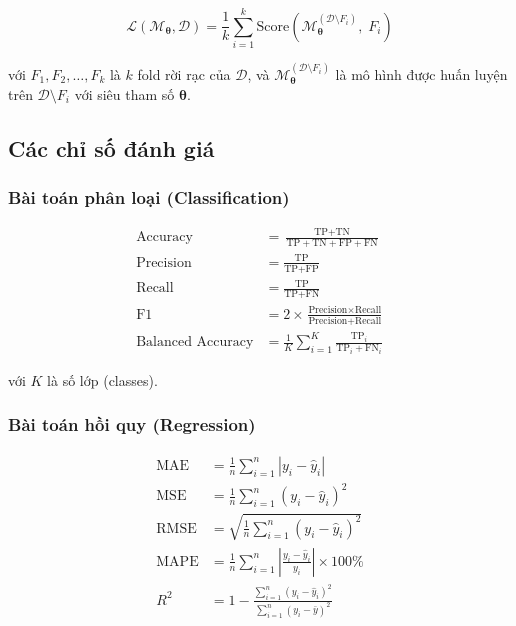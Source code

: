 \documentclass[12pt,a4paper]{article}
\begin{document}
\begin{equation}
    \mathcal{L}(\mathcal{M}_{\boldsymbol{\theta}}, \mathcal{D}) =
    \frac{1}{k} \sum_{i=1}^{k}
    \text{Score}\!\left(
        \mathcal{M}_{\boldsymbol{\theta}}^{(\mathcal{D} \setminus F_i)},\; F_i
    \right)
    \label{eq:cv_score}
\end{equation}

\noindent với $F_1, F_2, \ldots, F_k$ là $k$ fold rời rạc của $\mathcal{D}$,
và $\mathcal{M}_{\boldsymbol{\theta}}^{(\mathcal{D} \setminus F_i)}$ là mô hình
được huấn luyện trên $\mathcal{D} \setminus F_i$ với siêu tham số
$\boldsymbol{\theta}$.

\subsection{Các chỉ số đánh giá}

\subsubsection{Bài toán phân loại (Classification)}

\begin{align}
    \text{Accuracy} &= \frac{\text{TP} + \text{TN}}
                          {\text{TP} + \text{TN} + \text{FP} + \text{FN}}
    \label{eq:accuracy} \\[6pt]
    \text{Precision} &= \frac{\text{TP}}{\text{TP} + \text{FP}}
    \label{eq:precision} \\[6pt]
    \text{Recall} &= \frac{\text{TP}}{\text{TP} + \text{FN}}
    \label{eq:recall} \\[6pt]
    \text{F1} &= 2 \times \frac{\text{Precision} \times \text{Recall}}
                               {\text{Precision} + \text{Recall}}
    \label{eq:f1} \\[6pt]
    \text{Balanced Accuracy} &= \frac{1}{K} \sum_{i=1}^{K}
    \frac{\text{TP}_i}{\text{TP}_i + \text{FN}_i}
    \label{eq:balanced_accuracy}
\end{align}

\noindent với $K$ là số lớp (classes).

\subsubsection{Bài toán hồi quy (Regression)}

\begin{align}
    \text{MAE} &= \frac{1}{n} \sum_{i=1}^{n} |y_i - \hat{y}_i|
    \label{eq:mae} \\[6pt]
    \text{MSE} &= \frac{1}{n} \sum_{i=1}^{n} (y_i - \hat{y}_i)^2
    \label{eq:mse} \\[6pt]
    \text{RMSE} &= \sqrt{\frac{1}{n} \sum_{i=1}^{n} (y_i - \hat{y}_i)^2}
    \label{eq:rmse} \\[6pt]
    \text{MAPE} &= \frac{1}{n} \sum_{i=1}^{n}
    \left|\frac{y_i - \hat{y}_i}{y_i}\right| \times 100\%
    \label{eq:mape} \\[6pt]
    R^2 &= 1 - \frac{\displaystyle\sum_{i=1}^{n}(y_i - \hat{y}_i)^2}
                     {\displaystyle\sum_{i=1}^{n}(y_i - \bar{y})^2}
    \label{eq:r2}
\end{align}
\end{document}
